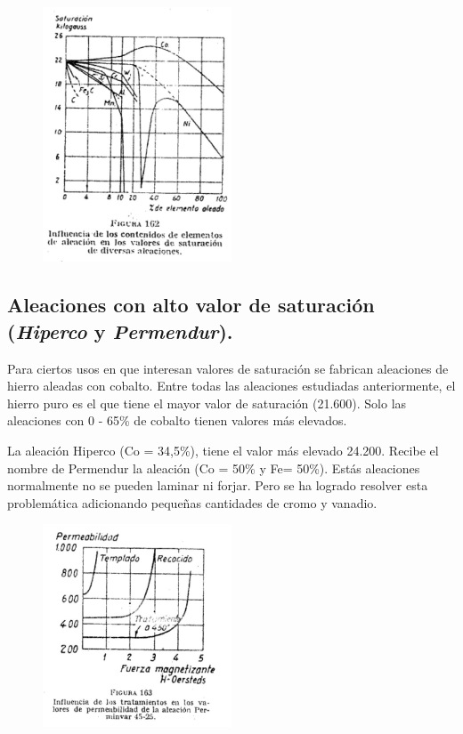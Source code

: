 \documentclass[12pt,a4paper]{article}
\begin{document}
\begin{figure}[H]    
    \centering         
    \includegraphics[width=0.5\textwidth]{IMAGENES LATEX/8.jpg}
\end{figure}

\subsection{Aleaciones con alto valor de saturación (\textit{Hiperco} y \textit{Permendur}).}

Para ciertos usos en que interesan valores de saturación se fabrican aleaciones de hierro aleadas con cobalto. Entre todas las aleaciones estudiadas anteriormente, el hierro puro es el que tiene el mayor valor de saturación (21.600). Solo las aleaciones con 0 - 65\% de cobalto tienen valores más elevados.

La aleación Hiperco (Co = 34,5\%), tiene el valor más elevado 24.200. Recibe el nombre de Permendur la aleación (Co = 50\% y Fe= 50\%). Estás aleaciones normalmente no se pueden laminar ni forjar. Pero se ha logrado resolver esta problemática adicionando pequeñas cantidades de cromo y vanadio.

\begin{figure}[H]    
    \centering         
    \includegraphics[width=0.5\textwidth]{IMAGENES LATEX/9.jpg}
\end{figure}
\end{document}

